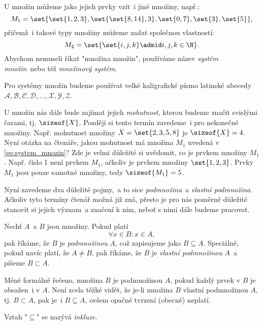U množin můžeme jako jejich prvky vzít~i jiné množiny, např.:
\begin{equation}\label{eq:system_mnozin}
    M_1=\set{\set{1,2,3},\set{\set{8,14},3},\set{0,7}, \set{3}, \set{5}},
\end{equation}
přičemž~i takové typy množiny můžeme zadat společnou vlastností:
\begin{equation*}
    M_2=\set{\set{i,j,k} \admid i,j,k\in\N}.
\end{equation*}
Abychom nemuseli říkat "množina množin", používáme název \emph{systém množin}~nebo též \emph{množinový systém}.
\begin{convention}
    Pro systémy množin budeme používat velké kaligrafické písmo latinské abecedy $\mathcal{A},\mathcal{B},\mathcal{C},\mathcal{D},\dots,\mathcal{X},\mathcal{Y},\mathcal{Z}$.
\end{convention}
U množin nás dále bude zajímat jejich \emph{mohutnost}, kterou budeme značit svislými čarami, tj. $\sizeof{X}$. Později si tento termín zavedeme~i pro nekonečné množiny. Např. mohutnost množiny $X=\set{2,3,5,8}$ je $\sizeof{X}=4$. Nyní otázka na čtenáře, jakou mohutnost má množina $M_1$ uvedená v \eqref{eq:system_mnozin}? Zde je velmi důležité si uvědomit, co je prvkem množiny $M_1$. Např. číslo 1 není prvkem $M_1$, ačkoliv je prvkem množiny $\set{1,2,3}$. Prvky $M_1$ jsou pouze samotné množiny, tedy $\sizeof{M_1}=5$.\par
\medskip
Nyní zavedeme dva důležité pojmy,~a to sice \emph{podmnožina}~a \emph{vlastní podmnožina}. Ačkoliv tyto termíny čtenář možná již zná, přesto je pro nás poměrně důležité stanovit si jejich význam~a značení k nim, neboť s nimi dále budeme pracovat.
\begin{definition}\label{def:podmnozina}
    Nechť $A$~a $B$ jsou množiny. Pokud platí
    \begin{equation*}
        \forall x\in B: x\in A,
    \end{equation*}
    pak říkáme, že $B$ je \emph{podmnožinou} $A$, což zapisujeme jako $B \subseteq A$. Speciálně, pokud navíc platí, že $A \neq B$, pak říkáme, že $B$ je \emph{vlastní podmnožinou} $A$~a píšeme $B \subset A$.
\end{definition}
Méně formálně řečeno, množina $B$ je podmnožinou $A$, pokud každý prvek v $B$ je obsažen~i v $A$. Není zcela těžké vidět, že je-li množina $B$ vlastní podmnožinou $A$, tj. $B \subset A$, pak je~i $B \subseteq A$, ovšem opačné tvrzení (obecně) neplatí.
\begin{remark}
    Vztah "$\subseteq$" se nazývá \emph{inkluze}.
\end{remark}

